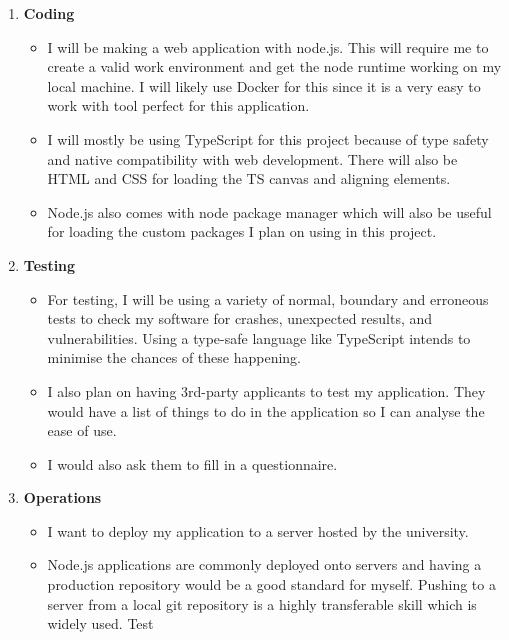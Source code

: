 \documentclass{report}
\begin{document}
\begin{enumerate}
    \item \textbf{\large{Coding}}
    \begin{itemize}
        \item I will be making a web application with node.js. This will require me to create a valid work environment and get the node runtime working on my local machine. I will likely use Docker for this since it is a very easy to work with tool perfect for this application.
        \item I will mostly be using TypeScript for this project because of type safety and native compatibility with web development. There will also be HTML and CSS for loading the TS canvas and aligning elements.
        \item Node.js also comes with node package manager which will also be useful for loading the custom packages I plan on using in this project.
    \end{itemize}
    \item \textbf{\large{Testing}}
    \begin{itemize}
        \item For testing, I will be using a variety of normal, boundary and erroneous tests to check my software for crashes, unexpected results, and vulnerabilities. Using a type-safe language like TypeScript intends to minimise the chances of these happening.
        \item I also plan on having 3rd-party applicants to test my application. They would have a list of things to do in the application so I can analyse the ease of use.
        \item I would also ask them to fill in a questionnaire.
    \end{itemize}
    \item \textbf{\large{Operations}}
    \begin{itemize}
        \item I want to deploy my application to a server hosted by the university.
        \item Node.js applications are commonly deployed onto servers and having a production repository would be a good standard for myself. Pushing to a server from a local git repository is a highly transferable skill which is widely used. Test
    \end{itemize}
\end{enumerate}
\end{document}
